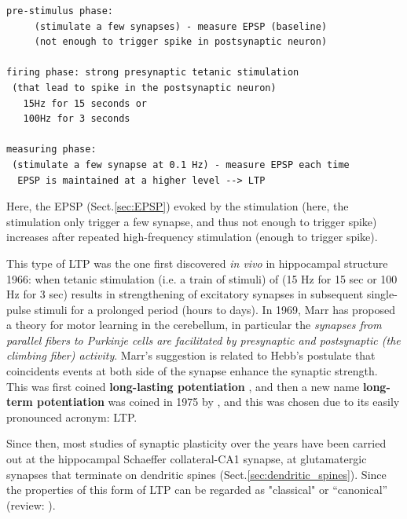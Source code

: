 \begin{verbatim}
pre-stimulus phase:
     (stimulate a few synapses) - measure EPSP (baseline)
	 (not enough to trigger spike in postsynaptic neuron)

firing phase: strong presynaptic tetanic stimulation
 (that lead to spike in the postsynaptic neuron)
   15Hz for 15 seconds or
   100Hz for 3 seconds

measuring phase:
 (stimulate a few synapse at 0.1 Hz) - measure EPSP each time
  EPSP is maintained at a higher level --> LTP
\end{verbatim}
Here, the EPSP (Sect.\ref{sec:EPSP}) evoked by the stimulation (here, the
stimulation only trigger a few synapse, and thus not enough to trigger spike)
increases after repeated high-frequency stimulation (enough to trigger spike).


This type of LTP was the one first discovered {\it in vivo} in hippocampal
structure 1966:
when tetanic stimulation (i.e. a train of stimuli) of (15 Hz for 15 sec or 100
Hz for 3 sec) results in strengthening of excitatory synapses in subsequent
single-pulse stimuli for a prolonged period (hours to days).
In 1969, Marr has proposed a theory for motor learning in the cerebellum, in
particular the {\it synapses from parallel fibers to Purkinje cells are
facilitated by presynaptic and postsynaptic (the climbing fiber) activity}.
Marr's suggestion is related to Hebb's postulate that coincidents events at both
side of the synapse enhance the synaptic strength.
This was first coined {\bf long-lasting potentiation} \citep{bliss1973}, and
then a new name {\bf long-term potentiation} was coined in 1975 by
\citep{douglas1975}, and this was chosen due to its easily pronounced acronym:
LTP.

Since then, most studies of synaptic plasticity over the years have been carried
out at the hippocampal Schaeffer collateral-CA1 synapse, at glutamatergic
synapses that terminate on dendritic spines (Sect.\ref{sec:dendritic_spines}).
Since the properties of this form of LTP can be regarded as "classical" or
``canonical'' (review:
\citep{sjostrom2008}).



  
